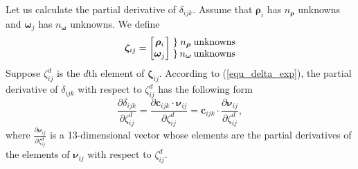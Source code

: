 \documentclass{vgtc}                          %
\begin{document}
Let us calculate the partial derivative of $\delta_{ijk}$. Assume that $\bm{\rho}_{i}$ has  $n_{\bm{\rho}}$ unknowns  and $\bm{\omega}_{j}$ has $n_{\bm{\omega}}$ unknowns. %
We define 
\begin{equation}
	\bm{\zeta}_{ij}  = \begin{bmatrix}
		\bm{\rho}_{i} \\
		\bm{\omega}_{j}
	\end{bmatrix}
	\setlength\arraycolsep{1pt}
	\begin{matrix}
		\left. \right\rbrace & n_{\bm{\rho}}  & \text{unknowns}\\
		\left. \right\rbrace & n_{\bm{\omega}} & \text{unknowns}
	\end{matrix}
\end{equation}
Suppose $\zeta_{ij}^d$ is the $d$th element of $\bm{\zeta}_{ij}$. %
According to (\ref{equ_delta_exp}), the partial derivative of $\delta_{ijk}$ with respect to  $\zeta_{ij}^{d}$ has the following form
\begin{equation} \label{equ_partial_der}
\frac{\partial \delta_{ijk} }{\partial \zeta_{ij}^{d}} =  \frac{\partial \mathbf{c}_{ijk} \cdot \bm{\nu}_{ij}}{\partial \zeta_{ij}^{d}}= \mathbf{c}_{ijk} \cdot \frac{\partial \bm{\nu}_{ij}}{\partial \zeta_{ij}^{d}},
\end{equation}
where $ \frac{\partial \bm{\nu}_{ij}}{\partial \zeta_{ij}^{d}}$ is a 13-dimensional vector whose elements are the partial derivatives  of  the elements of $\bm{\nu}_{ij}$ with respect to  $\zeta_{ij}^d$. %
\end{document}
